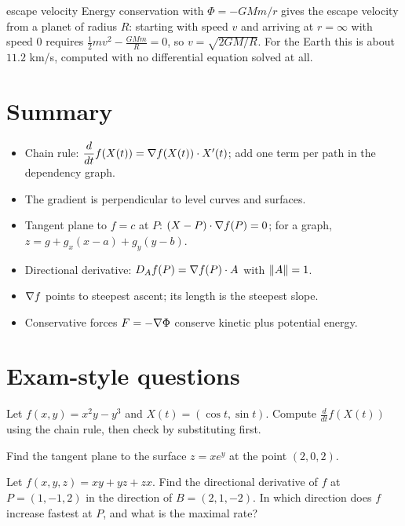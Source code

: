 \begin{reallife}{escape velocity}
Energy conservation with $\Phi=-GMm/r$ gives the escape velocity from a planet of radius
$R$: starting with speed $v$ and arriving at $r=\infty$ with speed $0$ requires
$\tfrac12mv^2-\frac{GMm}{R}=0$, so $v=\sqrt{2GM/R}$. For the Earth this is about
$11.2$ km/s, computed with no differential equation solved at all.
\end{reallife}

\section{Summary}

\begin{keyidea}
\begin{itemize}
  \item Chain rule: $\dfrac{d}{dt}f(X(t))=\nabla f(X(t))\cdot X'(t)$; add one term per path in the dependency graph.
  \item The gradient is perpendicular to level curves and surfaces.
  \item Tangent plane to $f=c$ at $P$: $(X-P)\cdot\nabla f(P)=0$; for a graph, $z=g+g_x(x-a)+g_y(y-b)$.
  \item Directional derivative: $D_Af(P)=\nabla f(P)\cdot A$ with $\left\lVert A\right\rVert=1$.
  \item $\nabla f$ points to steepest ascent; its length is the steepest slope.
  \item Conservative forces $F=-\nabla\Phi$ conserve kinetic plus potential energy.
\end{itemize}
\end{keyidea}

\section{Exam-style questions}

\begin{exercise}[1]
Let $f(x,y)=x^2y-y^3$ and $X(t)=(\cos t,\sin t)$. Compute $\frac{d}{dt}f(X(t))$ using the
chain rule, then check by substituting first.
\end{exercise}

\begin{exercise}[1]
Find the tangent plane to the surface $z=xe^{y}$ at the point $(2,0,2)$.
\end{exercise}

\begin{exercise}[2]
Let $f(x,y,z)=xy+yz+zx$. Find the directional derivative of $f$ at $P=(1,-1,2)$ in the
direction of $B=(2,1,-2)$. In which direction does $f$ increase fastest at $P$, and what
is the maximal rate?
\end{exercise}

